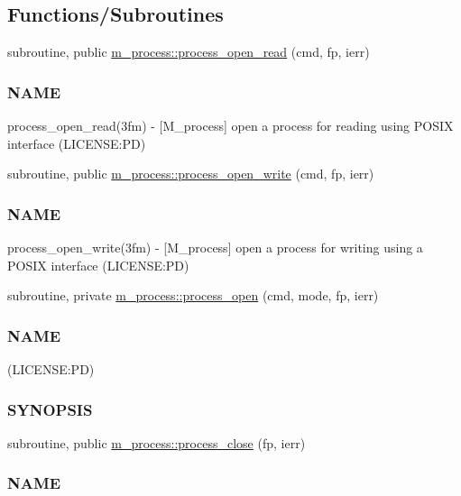 \subsection*{Functions/\+Subroutines}
\begin{DoxyCompactItemize}
\item 
subroutine, public \mbox{\hyperlink{namespacem__process_aaaf4d1926258a4cec7da7fc61c38c79d}{m\+\_\+process\+::process\+\_\+open\+\_\+read}} (cmd, fp, ierr)
\begin{DoxyCompactList}\small\item\em \subsubsection*{N\+A\+ME}

process\+\_\+open\+\_\+read(3fm) -\/ \mbox{[}M\+\_\+process\mbox{]} open a process for reading using P\+O\+S\+IX interface (L\+I\+C\+E\+N\+SE\+:PD) \end{DoxyCompactList}\item 
subroutine, public \mbox{\hyperlink{namespacem__process_aa6ed1404ab3472f5068ed15a7a01defc}{m\+\_\+process\+::process\+\_\+open\+\_\+write}} (cmd, fp, ierr)
\begin{DoxyCompactList}\small\item\em \subsubsection*{N\+A\+ME}

process\+\_\+open\+\_\+write(3fm) -\/ \mbox{[}M\+\_\+process\mbox{]} open a process for writing using a P\+O\+S\+IX interface (L\+I\+C\+E\+N\+SE\+:PD) \end{DoxyCompactList}\item 
subroutine, private \mbox{\hyperlink{namespacem__process_a3c0f543a9ceff2671041d73660f60a59}{m\+\_\+process\+::process\+\_\+open}} (cmd, mode, fp, ierr)
\begin{DoxyCompactList}\small\item\em \subsubsection*{N\+A\+ME}

(L\+I\+C\+E\+N\+SE\+:PD) \subsubsection*{S\+Y\+N\+O\+P\+S\+IS}\end{DoxyCompactList}\item 
subroutine, public \mbox{\hyperlink{namespacem__process_ab4c5cad3fb46686f0c9b71c3a634f6ae}{m\+\_\+process\+::process\+\_\+close}} (fp, ierr)
\begin{DoxyCompactList}\small\item\em \subsubsection*{N\+A\+ME}


\end{DoxyCompactList}
\end{DoxyCompactItemize}

